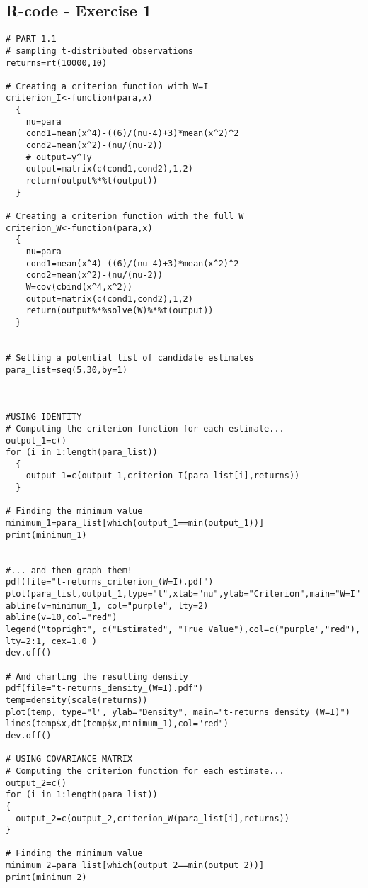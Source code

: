 \begin{appendices}

\chapter{R-code - Exercise 1}

\begin{verbatim}
# PART 1.1
# sampling t-distributed observations
returns=rt(10000,10)

# Creating a criterion function with W=I
criterion_I<-function(para,x)
  {
    nu=para
    cond1=mean(x^4)-((6)/(nu-4)+3)*mean(x^2)^2
    cond2=mean(x^2)-(nu/(nu-2))
    # output=y^Ty
    output=matrix(c(cond1,cond2),1,2)
    return(output%*%t(output))
  }

# Creating a criterion function with the full W
criterion_W<-function(para,x)
  {
    nu=para
    cond1=mean(x^4)-((6)/(nu-4)+3)*mean(x^2)^2
    cond2=mean(x^2)-(nu/(nu-2))
    W=cov(cbind(x^4,x^2))
    output=matrix(c(cond1,cond2),1,2)
    return(output%*%solve(W)%*%t(output))
  }


# Setting a potential list of candidate estimates
para_list=seq(5,30,by=1)



#USING IDENTITY
# Computing the criterion function for each estimate...
output_1=c()
for (i in 1:length(para_list))
  {
    output_1=c(output_1,criterion_I(para_list[i],returns))
  }

# Finding the minimum value
minimum_1=para_list[which(output_1==min(output_1))]
print(minimum_1)


#... and then graph them!
pdf(file="t-returns_criterion_(W=I).pdf")
plot(para_list,output_1,type="l",xlab="nu",ylab="Criterion",main="W=I")
abline(v=minimum_1, col="purple", lty=2)
abline(v=10,col="red")
legend("topright", c("Estimated", "True Value"),col=c("purple","red"), lty=2:1, cex=1.0 )
dev.off()

# And charting the resulting density
pdf(file="t-returns_density_(W=I).pdf")
temp=density(scale(returns))
plot(temp, type="l", ylab="Density", main="t-returns density (W=I)")
lines(temp$x,dt(temp$x,minimum_1),col="red")
dev.off()

# USING COVARIANCE MATRIX
# Computing the criterion function for each estimate...
output_2=c()
for (i in 1:length(para_list))
{
  output_2=c(output_2,criterion_W(para_list[i],returns))
}

# Finding the minimum value
minimum_2=para_list[which(output_2==min(output_2))]
print(minimum_2)



\end{verbatim}
\end{appendices}
